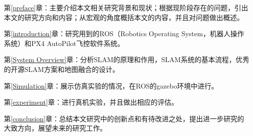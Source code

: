 第\ref{preface}章：主要介绍本文相关研究背景和现状；根据现阶段存在的问题，引出本文的研究方向和内容；从宏观的角度概括本文的内容，并且对问题做出概述。

第\ref{introduction}章：研究用到的ROS（Robotics Operating System，机器人操作系统）和PX4 AutoPilot飞控软件系统。

第\ref{System Overview}章：分析SLAM的原理和作用，SLAM系统的基本流程，优秀的开源SLAM方案和地图融合的设计。

第\ref{Simulation}章：展示仿真实验的情况，在ROS的gazebo环境中进行。

第\ref{experiment}章：进行真机实验，并且做出相应的评估。

第\ref{conclusion}章：总结本文研究中的创新点和有待改进之处，提出进一步研究的大致方向，展望未来的研究工作。

